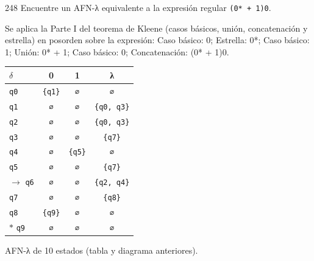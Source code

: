 \documentclass[11pt]{article}
\begin{document}
\begin{ejercicio}{248}{}
Encuentre un AFN-λ equivalente a la expresión regular \texttt{(0* + 1)0}.
\end{ejercicio}
\proc Se aplica la Parte I del teorema de Kleene (casos básicos, unión, concatenación y estrella) en posorden sobre la expresión: Caso básico: 0; Estrella: 0*; Caso básico: 1; Unión: 0* + 1; Caso básico: 0; Concatenación: (0* + 1)0.
\begin{center}\small\begin{tabular}{lccc}\toprule
$\delta$ & 0 & 1 & λ \\\midrule
 \texttt{q0} & \texttt{\{q1\}} & \texttt{∅} & \texttt{∅} \\
 \texttt{q1} & \texttt{∅} & \texttt{∅} & \texttt{\{q0, q3\}} \\
 \texttt{q2} & \texttt{∅} & \texttt{∅} & \texttt{\{q0, q3\}} \\
 \texttt{q3} & \texttt{∅} & \texttt{∅} & \texttt{\{q7\}} \\
 \texttt{q4} & \texttt{∅} & \texttt{\{q5\}} & \texttt{∅} \\
 \texttt{q5} & \texttt{∅} & \texttt{∅} & \texttt{\{q7\}} \\
$\to$ \texttt{q6} & \texttt{∅} & \texttt{∅} & \texttt{\{q2, q4\}} \\
 \texttt{q7} & \texttt{∅} & \texttt{∅} & \texttt{\{q8\}} \\
 \texttt{q8} & \texttt{\{q9\}} & \texttt{∅} & \texttt{∅} \\
$*$ \texttt{q9} & \texttt{∅} & \texttt{∅} & \texttt{∅} \\
\bottomrule\end{tabular}\end{center}

\resp AFN-λ de 10 estados (tabla y diagrama anteriores).
\end{document}
